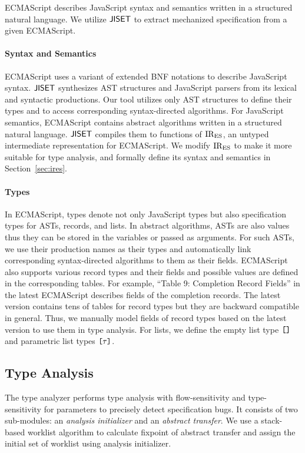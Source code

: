 ECMAScript describes JavaScript syntax and semantics written in a structured
natural language.  We utilize $\textsf{JISET}$ to extract mechanized specification from
a given ECMAScript.

\paragraph{Syntax and Semantics} ECMAScript uses a variant of extended BNF
notations to describe JavaScript syntax.  $\textsf{JISET}$ synthesizes AST structures
and JavaScript parsers from its lexical and syntactic productions.  Our tool
utilizes only AST structures to define their types and to access corresponding
syntax-directed algorithms.  For JavaScript semantics, ECMAScript contains
abstract algorithms written in a structured natural language.  $\textsf{JISET}$ compiles
them to functions of ${\text{IR}_\text{ES}}$, an untyped intermediate representation for
ECMAScript.  We modify ${\text{IR}_\text{ES}}$ to make it more suitable for type analysis, and
formally define its syntax and semantics in Section~\ref{sec:ires}.

\paragraph{Types} In ECMAScript, types denote not only JavaScript types but also
specification types for ASTs, records, and lists.  In abstract algorithms, ASTs
are also values thus they can be stored in the variables or passed as arguments.
For such ASTs, we use their production names as their types and automatically
link corresponding syntax-directed algorithms to them as their fields.
ECMAScript also supports various record types and their fields and possible
values are defined in the corresponding tables.  For example, ``Table 9:
Completion Record Fields'' in the latest ECMAScript describes fields of the
completion records.  The latest version contains tens of tables for record types
but they are backward compatible in general.  Thus, we manually model fields of
record types based on the latest version to use them in type analysis.  For
lists, we define the empty list type $\texttt{[}  \texttt{]}$ and parametric list types
$\texttt{[} \tau \texttt{]}$.


\subsection{Type Analysis}\label{sec:overview-type-analysis}

The type analyzer performs type analysis with flow-sensitivity and
type-sensitivity for parameters to precisely detect specification bugs.  It
consists of two sub-modules: an \textit{analysis initializer} and an
\textit{abstract transfer}.  We use a stack-based worklist algorithm to
calculate fixpoint of abstract transfer and assign the initial set of worklist
using analysis initializer.

